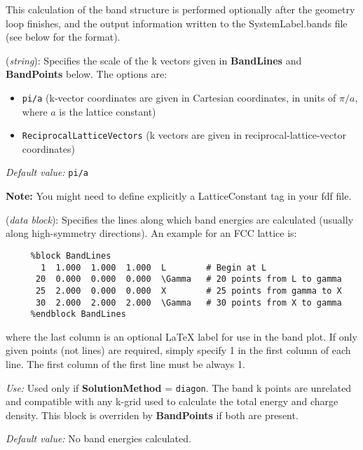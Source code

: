 \documentclass[11pt]{article}
\begin{document}
This calculation of the band structure is performed optionally after
the geometry loop finishes, and the output information written
to the SystemLabel.bands file (see below for the format).

\begin{description}
\itemsep 10pt
\parsep 0pt

\item[{\bf BandLinesScale}] ({\it string}):
Specifies the scale of the k vectors given in {\bf BandLines}
and {\bf BandPoints} below.
The options are:
\begin{itemize}
\item {\tt pi/a} (k-vector coordinates are given in Cartesian
coordinates, in units of $\pi/a$, where $a$ is the lattice constant)
\item {\tt ReciprocalLatticeVectors} (k vectors are given in
reciprocal-lattice-vector coordinates)
\end{itemize}

{\it Default value:} {\tt pi/a}

{\bf Note:} You might need to define explicitly a LatticeConstant tag
in your fdf file.

\item[{\bf BandLines}] ({\it data block}):
Specifies the lines along which band energies are calculated
(usually along high-symmetry directions).
An example for an FCC lattice is:

\begin{verbatim}
     %block BandLines
       1  1.000  1.000  1.000  L        # Begin at L
      20  0.000  0.000  0.000  \Gamma   # 20 points from L to gamma
      25  2.000  0.000  0.000  X        # 25 points from gamma to X
      30  2.000  2.000  2.000  \Gamma   # 30 points from X to gamma
     %endblock BandLines
\end{verbatim}

where the last column is an optional LaTeX label for use in the band plot.
If only given points (not lines) are required, simply specify 1 in the
first column of each line. The first column of the first line must be
always 1.

{\it Use:} Used only if {\bf SolutionMethod} = {\tt diagon}.
The band k points are unrelated and compatible with any k-grid used
to calculate the total energy and charge density.
This block is overriden by {\bf BandPoints} if both are present.

{\it Default value:} No band energies calculated.


\end{description}
\end{document}
